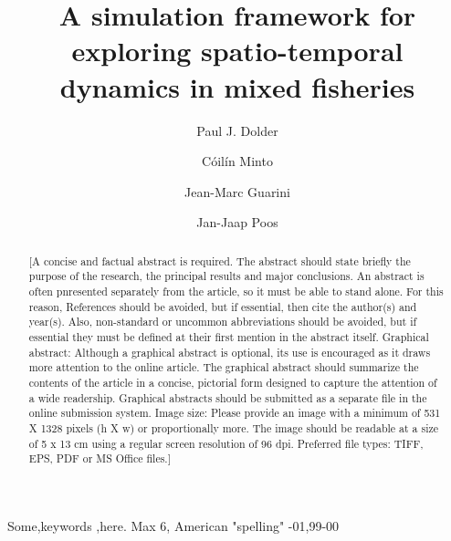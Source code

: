 \documentclass[review]{elsarticle}
\begin{document}
\begin{frontmatter}

\title{A simulation framework for exploring spatio-temporal dynamics in mixed
	fisheries}

\author[1,2]{Paul J. Dolder}

\author[1]{Cóilín Minto}
\author[3]{Jean-Marc Guarini}
\author[4]{Jan-Jaap Poos}

\address[1]{Galway-Mayo Institute of Technology (GMIT), Dublin Road, Galway,
	Ireland} 
\address[2]{Centre for Environment, Fisheries and Aquaculture Science (Cefas),
	Pakefield Road, Lowestoft, UK}
\address[3]{Université Pierre et Marie Curie, 4 Place Jussieu, 75005 Paris,
	France}
\address[4]{Wageningen Marine Research, Haringkade 1 1976 CP IJmuiden,
	Netherlands}

\begin{abstract}
[A concise and factual abstract is required. The abstract should state briefly
the purpose of the research, the principal results and major conclusions. An
abstract is often pnresented separately from the article, so it must be able to
stand alone. For this reason, References should be avoided, but if essential,
then cite the author(s) and year(s). Also, non-standard or uncommon
abbreviations should be avoided, but if essential they must be defined at their
first mention in the abstract itself.  
Graphical abstract: Although a graphical abstract is optional, its use is
encouraged as it draws more attention to the online article. The graphical
abstract should summarize the contents of the article in a concise, pictorial
form designed to capture the attention of a wide readership. Graphical
abstracts should be submitted as a separate file in the online submission
system. Image size: Please provide an image with a minimum of 531 X 1328 pixels
(h X w) or proportionally more. The image should be readable at a size of 5 x
13 cm using a regular screen resolution of 96 dpi.  Preferred file types: TIFF,
EPS, PDF or MS Office files.]
\end{abstract}

\begin{keyword}
Some\sep keywords \sep here. Max 6, American "spelling" 
-01\sep  99-00
\end{keyword}

\end{frontmatter}

\linenumbers
\end{document}
